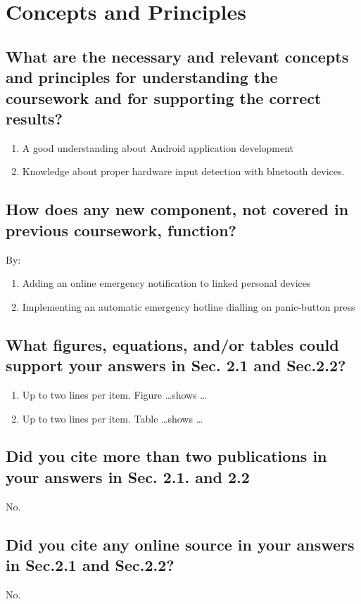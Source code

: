 \section{Concepts and Principles}
\label{sec:concps}

\subsection{What are the necessary and relevant concepts and principles for understanding the coursework and for supporting the correct results?}
\begin{enumerate}
	\item A good understanding about Android application development 
	\item Knowledge about proper hardware input detection with bluetooth devices.
	
\end{enumerate}

\subsection{How does any new component, not covered in  previous coursework, function?}
By:
\begin{enumerate}
	\item Adding an online emergency notification to linked personal devices
	\item Implementing an automatic emergency hotline dialling on panic-button press
\end{enumerate}


\subsection{What figures, equations, and/or tables could support your answers in Sec. 2.1 and Sec.2.2?}
\begin{enumerate}
	\item Up to two lines per item. Figure \ldots shows \ldots
	\item Up to two lines per item. Table \ldots shows \ldots
\end{enumerate}

\subsection{Did you cite more than two publications in your answers in Sec. 2.1. and 2.2}
No.
	
\subsection{Did you cite any online source in your answers in Sec.2.1 and Sec.2.2?}
No.


